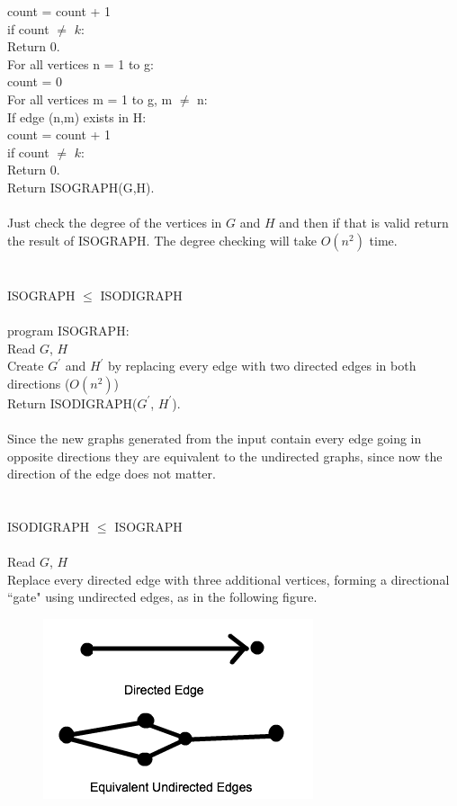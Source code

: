 \documentclass[10pt]{article}
\newcommand{\tab}{\hspace*{2em}}
\newcommand{\tabb}{\hspace*{4em}}
\newcommand{\tabbb}{\hspace*{6em}}
\newcommand{\tabbbb}{\hspace*{8em}}
\begin{document}
		\tabbbb count = count + 1\\
		\tabb if count $\neq$ $k$:\\
		\tabbb Return 0.\\
		\tab For all vertices n = 1 to g:\\
		\tabb count = 0\\
		\tabb For all vertices m = 1 to g, m $\neq$ n:\\
		\tabbb If edge (n,m) exists in H:\\
		\tabbbb count = count + 1\\
		\tabb if count $\neq$ $k$:\\
		\tabbb Return 0.\\
		\tab Return ISOGRAPH(G,H).\\
		\\
		Just check the degree of the vertices in $G$ and $H$ and then if that is valid return the result of ISOGRAPH. The degree checking will
		take $O(n^2)$ time.\\
		\\
		\\
		ISOGRAPH $\leq$ ISODIGRAPH\\
		\\
		program ISOGRAPH:\\
		\tab Read $G$, $H$\\
		\tab Create $G^\prime$ and $H^\prime$ by replacing every edge with two directed edges in both directions ($O(n^2)$)\\
		\tab Return ISODIGRAPH($G^\prime$, $H^\prime$).\\
		\\
		Since the new graphs generated from the input contain every edge going in opposite directions they are equivalent
		to the undirected graphs, since now the direction of the edge does not matter.\\
		\\
		\\
		ISODIGRAPH $\leq$ ISOGRAPH\\
		\\
		Read $G$, $H$\\
		Replace every directed edge with three additional vertices, forming a directional ``gate" using undirected edges, as in the following figure.\\
		\begin{figure}[h]
			\centering
			\includegraphics[width=300px]{21digraph.png}
		\end{figure}
\end{document}
